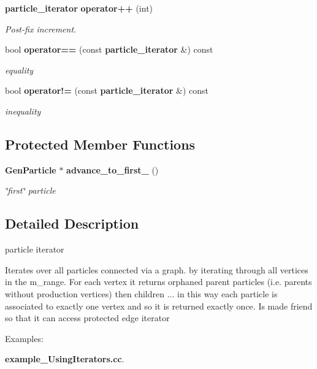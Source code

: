 \begin{CompactItemize}
{\bf particle\_\-iterator} {\bf operator++} (int)
\begin{CompactList}\small\item\em Post-fix increment. \item\end{CompactList}\item 
bool {\bf operator==} (const {\bf particle\_\-iterator} \&) const
\begin{CompactList}\small\item\em equality \item\end{CompactList}\item 
bool {\bf operator!=} (const {\bf particle\_\-iterator} \&) const
\begin{CompactList}\small\item\em inequality \item\end{CompactList}\end{CompactItemize}
\subsection*{Protected Member Functions}
\begin{CompactItemize}
\item 
{\bf Gen\-Particle} $\ast$ {\bf advance\_\-to\_\-first\_\-} ()
\begin{CompactList}\small\item\em \char`\"{}first\char`\"{} particle \item\end{CompactList}\end{CompactItemize}


\subsection{Detailed Description}
particle iterator 

Iterates over all particles connected via a graph. by iterating through all vertices in the m\_\-range. For each vertex it returns orphaned parent particles (i.e. parents without production vertices) then children ... in this way each particle is associated to exactly one vertex and so it is returned exactly once. Is made friend so that it can access protected edge iterator \begin{Desc}
\item[Examples: ]\par


{\bf example\_\-Using\-Iterators.cc}.\end{Desc}





